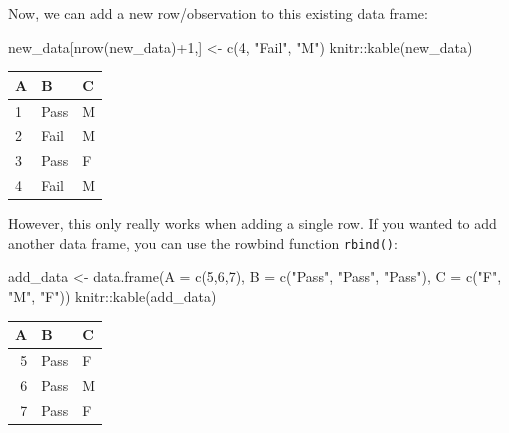 \documentclass[
]{book}
\newenvironment{Shaded}{\begin{snugshade}}{\end{snugshade}}
\newcommand{\AttributeTok}[1]{\textcolor[rgb]{0.77,0.63,0.00}{#1}}
\newcommand{\DecValTok}[1]{\textcolor[rgb]{0.00,0.00,0.81}{#1}}
\newcommand{\FunctionTok}[1]{\textcolor[rgb]{0.00,0.00,0.00}{#1}}
\newcommand{\NormalTok}[1]{#1}
\newcommand{\OtherTok}[1]{\textcolor[rgb]{0.56,0.35,0.01}{#1}}
\newcommand{\SpecialCharTok}[1]{\textcolor[rgb]{0.00,0.00,0.00}{#1}}
\newcommand{\StringTok}[1]{\textcolor[rgb]{0.31,0.60,0.02}{#1}}
\theoremstyle{definition}
\theoremstyle{definition}
\theoremstyle{definition}
\theoremstyle{definition}
\theoremstyle{remark}
\begin{document}
Now, we can add a new row/observation to this existing data frame:

\begin{Shaded}
\begin{Highlighting}[]
\NormalTok{new\_data[}\FunctionTok{nrow}\NormalTok{(new\_data)}\SpecialCharTok{+}\DecValTok{1}\NormalTok{,] }\OtherTok{\textless{}{-}} \FunctionTok{c}\NormalTok{(}\DecValTok{4}\NormalTok{, }\StringTok{"Fail"}\NormalTok{, }\StringTok{"M"}\NormalTok{)}
\NormalTok{knitr}\SpecialCharTok{::}\FunctionTok{kable}\NormalTok{(new\_data)}
\end{Highlighting}
\end{Shaded}

\begin{tabular}{l|l|l}
\hline
A & B & C\\
\hline
1 & Pass & M\\
\hline
2 & Fail & M\\
\hline
3 & Pass & F\\
\hline
4 & Fail & M\\
\hline
\end{tabular}

However, this only really works when adding a single row. If you wanted to add another data frame, you can use the rowbind function \texttt{rbind()}:

\begin{Shaded}
\begin{Highlighting}[]
\NormalTok{add\_data }\OtherTok{\textless{}{-}} \FunctionTok{data.frame}\NormalTok{(}\AttributeTok{A =} \FunctionTok{c}\NormalTok{(}\DecValTok{5}\NormalTok{,}\DecValTok{6}\NormalTok{,}\DecValTok{7}\NormalTok{), }\AttributeTok{B =} \FunctionTok{c}\NormalTok{(}\StringTok{"Pass"}\NormalTok{, }\StringTok{"Pass"}\NormalTok{, }\StringTok{"Pass"}\NormalTok{), }\AttributeTok{C =} \FunctionTok{c}\NormalTok{(}\StringTok{"F"}\NormalTok{, }\StringTok{"M"}\NormalTok{, }\StringTok{"F"}\NormalTok{))}
\NormalTok{knitr}\SpecialCharTok{::}\FunctionTok{kable}\NormalTok{(add\_data)}
\end{Highlighting}
\end{Shaded}

\begin{tabular}{r|l|l}
\hline
A & B & C\\
\hline
5 & Pass & F\\
\hline
6 & Pass & M\\
\hline
7 & Pass & F\\
\hline
\end{tabular}
\end{document}
